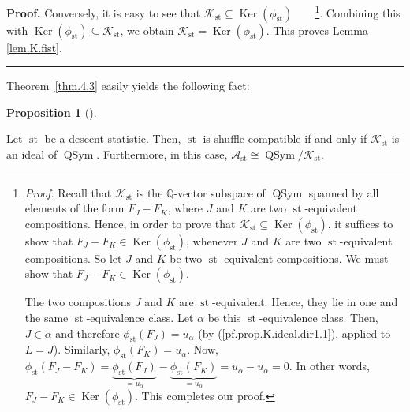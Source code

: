 \documentclass[numbers=enddot,12pt,final,onecolumn,notitlepage]{scrartcl}%
\theoremstyle{definition}
\newtheorem{prop}[theo]{Proposition}
\newenvironment{proposition}[1][]
{\begin{prop}[#1]\begin{leftbar}}
{\end{leftbar}\end{prop}}
\newenvironment{proof}[1][Proof]{\noindent\textbf{#1.} }{\ \rule{0.5em}{0.5em}}
\begin{document}
\begin{proof}
Conversely, it is easy to see that $\mathcal{K}_{\operatorname*{st}}%
\subseteq\operatorname*{Ker}\left(  \phi_{\operatorname*{st}}\right)
$\ \ \ \ \footnote{\textit{Proof.} Recall that $\mathcal{K}%
_{\operatorname*{st}}$ is the $\mathbb{Q}$-vector subspace of
$\operatorname*{QSym}$ spanned by all elements of the form $F_{J}-F_{K}$,
where $J$ and $K$ are two $\operatorname*{st}$-equivalent compositions. Hence,
in order to prove that $\mathcal{K}_{\operatorname*{st}}\subseteq
\operatorname*{Ker}\left(  \phi_{\operatorname*{st}}\right)  $, it suffices to
show that $F_{J}-F_{K}\in\operatorname*{Ker}\left(  \phi_{\operatorname*{st}%
}\right)  $, whenever $J$ and $K$ are two $\operatorname*{st}$-equivalent
compositions. So let $J$ and $K$ be two $\operatorname*{st}$-equivalent
compositions. We must show that $F_{J}-F_{K}\in\operatorname*{Ker}\left(
\phi_{\operatorname*{st}}\right)  $.
\par
The two compositions $J$ and $K$ are $\operatorname*{st}$-equivalent. Hence,
they lie in one and the same $\operatorname*{st}$-equivalence class. Let
$\alpha$ be this $\operatorname*{st}$-equivalence class. Then, $J\in\alpha$
and therefore $\phi_{\operatorname*{st}}\left(  F_{J}\right)  =u_{\alpha}$ (by
(\ref{pf.prop.K.ideal.dir1.1}), applied to $L=J$). Similarly, $\phi
_{\operatorname*{st}}\left(  F_{K}\right)  =u_{\alpha}$. Now, $\phi
_{\operatorname*{st}}\left(  F_{J}-F_{K}\right)  =\underbrace{\phi
_{\operatorname*{st}}\left(  F_{J}\right)  }_{=u_{\alpha}}-\underbrace{\phi
_{\operatorname*{st}}\left(  F_{K}\right)  }_{=u_{\alpha}}=u_{\alpha
}-u_{\alpha}=0$. In other words, $F_{J}-F_{K}\in\operatorname*{Ker}\left(
\phi_{\operatorname*{st}}\right)  $. This completes our proof.}. Combining
this with $\operatorname*{Ker}\left(  \phi_{\operatorname*{st}}\right)
\subseteq\mathcal{K}_{\operatorname*{st}}$, we obtain $\mathcal{K}%
_{\operatorname*{st}}=\operatorname*{Ker}\left(  \phi_{\operatorname*{st}%
}\right)  $. This proves Lemma \ref{lem.K.fist}.
\end{proof}

Theorem~\ref{thm.4.3} easily yields the following fact:

\begin{proposition}
\label{prop.K.ideal}Let $\operatorname*{st}$ be a descent statistic. Then,
$\operatorname*{st}$ is shuffle-compatible if and only if $\mathcal{K}%
_{\operatorname*{st}}$ is an ideal of $\operatorname*{QSym}$. Furthermore, in
this case, $\mathcal{A}_{\operatorname*{st}}\cong\operatorname*{QSym}%
/\mathcal{K}_{\operatorname*{st}}$.
\end{proposition}
\end{document}
